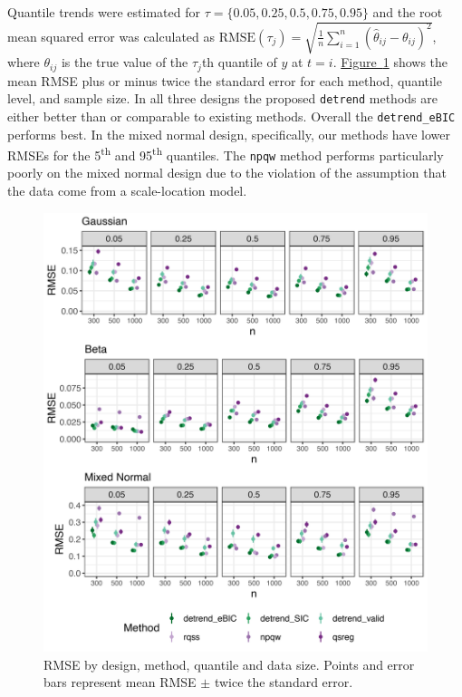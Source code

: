 \documentclass[aoas]{imsart}
\newcommand{\Fig}[1]{\hyperref[fig:#1]{Figure~\ref*{fig:#1}}} %
\newcommand{\Fig}[1]{{Figure~\ref{fig:#1}}} %
\begin{document}
Quantile trends were estimated for $\tau = \{0.05, 0.25, 0.5, 0.75, 0.95\}$ and the root mean squared error was calculated as $\mbox{RMSE}(\tau_j) = \sqrt{\frac{1}{n}\sum_{i=1}^n (\hat{\theta}_{ij} - \theta_{ij})^2}$, where $\theta_{ij}$ is the true value of the $\tau_j$th quantile of $y$ at $t=i$. \Fig{quantile_mse} shows the mean RMSE plus or minus twice the standard error for each method, quantile level, and sample size. In all three designs the proposed \texttt{detrend} methods are either better than or comparable to existing methods. Overall the \texttt{detrend\_eBIC} performs best. In the mixed normal design, specifically, our methods have lower RMSEs for the 5\textsuperscript{th} and 95\textsuperscript{th} quantiles. The \texttt{npqw} method performs particularly poorly on the mixed normal design due to the violation of the assumption that the data come from a scale-location model.

\begin{figure}
	\includegraphics[width=\linewidth]{Figures/sim_metrics.png}
	\caption{RMSE by design, method, quantile and data size. Points and error bars represent mean RMSE $\pm$ twice the standard error.}
	\label{fig:quantile_mse}
\end{figure}
\end{document}
